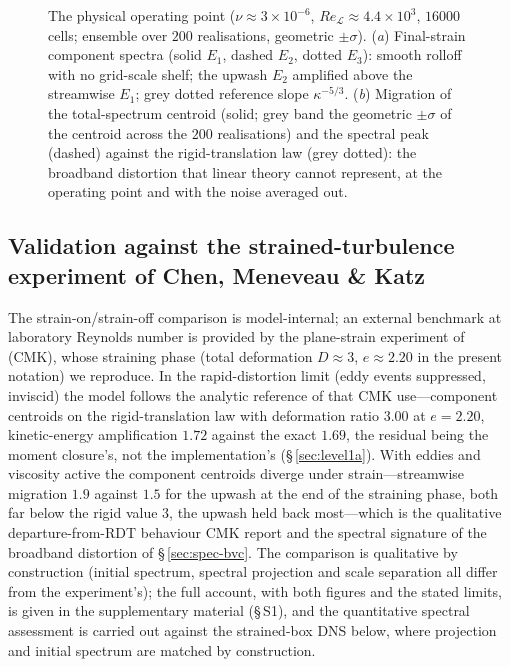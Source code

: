 \documentclass[11pt,a4paper]{article}
\begin{document}
\begin{figure}
  \centering
  \caption{The physical operating point ($\nu\approx3\times10^{-6}$,
  $Re_{\mathcal{L}}\approx4.4\times10^3$, $16000$ cells; ensemble over
  $200$ realisations, geometric $\pm\sigma$).
  (\textit{a}) Final-strain component spectra (solid $E_1$, dashed
  $E_2$, dotted $E_3$): smooth rolloff with no grid-scale shelf; the
  upwash $E_2$ amplified above the streamwise $E_1$; grey dotted
  reference slope $\kappa^{-5/3}$.
  (\textit{b}) Migration of the total-spectrum centroid (solid; grey
  band the geometric $\pm\sigma$ of the centroid across the $200$
  realisations) and the spectral peak (dashed) against the
  rigid-translation law (grey dotted):
  the broadband distortion that linear theory cannot represent, at the
  operating point and with the noise averaged out.}
  \label{fig:spec-op}
\end{figure}

\subsection{Validation against the strained-turbulence experiment of
Chen, Meneveau \& Katz}\label{sec:cmk}

The strain-on/strain-off comparison is model-internal; an external
benchmark at laboratory Reynolds number is provided by the plane-strain
experiment of \citet{ChenMeneveauKatz2006} (CMK), whose straining phase
(total deformation $D\approx3$, $e\approx2.20$ in the present notation)
we reproduce. In the rapid-distortion limit (eddy events suppressed,
inviscid) the model follows the analytic reference of
\citet{LeePiomelliReynolds1986} that CMK use---component centroids on
the rigid-translation law with deformation ratio $3.00$ at $e=2.20$,
kinetic-energy amplification $1.72$ against the exact $1.69$, the
residual being the moment closure's, not the implementation's
(\S\,\ref{sec:level1a}). With eddies and viscosity active the component
centroids diverge under strain---streamwise migration $1.9$ against
$1.5$ for the upwash at the end of the straining phase, both far below
the rigid value $3$, the upwash held back most---which is the
qualitative departure-from-RDT behaviour CMK report and the spectral
signature of the broadband distortion of \S\,\ref{sec:spec-bvc}. The
comparison is qualitative by construction (initial spectrum, spectral
projection and scale separation all differ from the experiment's); the
full account, with both figures and the stated limits, is given in the
supplementary material (\S\,S1), and the quantitative spectral
assessment is carried out against the strained-box DNS below, where
projection and initial spectrum are matched by construction.
\end{document}
